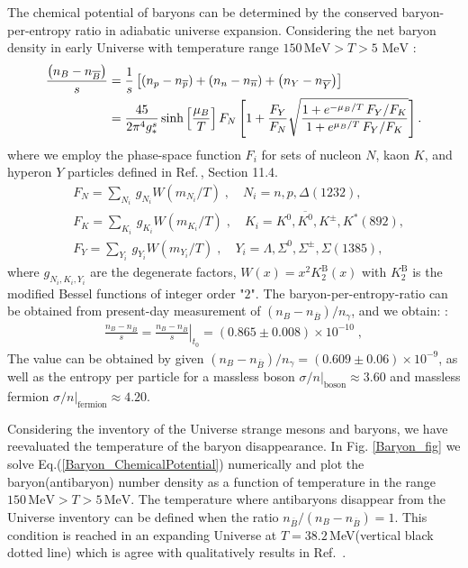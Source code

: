 \documentclass[universe,article,submit,moreauthors,pdftex,a4paper]{Definitions/mdpi}
\newcommand{\MeV}{\text{ MeV}}
\begin{document}
The chemical potential of baryons can be determined by the conserved baryon-per-entropy ratio in adiabatic universe expansion. Considering the net baryon density in early Universe with temperature range $150\,\mathrm{MeV}>T>5\MeV$ \cite{Yang:2021bko}:
\begin{align}\label{Baryon_ChemicalPotential}
\frac{\left(n_B-n_{\overline{B}}\right)}{s}&=\frac{1}{s}\left[\left(n_p-n_{\overline{p}}\right)+\left(n_n-n_{\overline{n}}\right)+\left(n_Y-n_{\overline{Y}}\right)\right]\notag\\
&=\frac{45}{2\pi^4g^s_\ast}\sinh\left[\frac{\mu_B}{T}\right]F_N\left[1+\frac{F_Y}{F_N}\sqrt{\frac{1+e^{-\mu_B/T}\,F_Y/F_K}{1+e^{\mu_B/T}\,F_Y/F_K}}\right].
\end{align}
where we employ the phase-space function $F_i$ for sets of nucleon $N$, kaon $K$, and hyperon $Y$ particles defined in Ref.\,\cite{Letessier:2002ony}, Section 11.4.
\begin{align}
&F_N=\sum_{N_i}\,g_{N_i}W(m_{N_i}/T)\;, \quad N_i=n, p, \Delta(1232),\\
&F_K=\sum_{K_i}\,g_{K_i}W(m_{K_i}/T)\;, \quad K_i=K^0, \overline{K^0}, K^\pm, K^\ast(892),\\
&F_Y=\sum_{Y_i}\,g_{Y_i}W(m_{Y_i}/T)\;, \quad Y_i=\Lambda, \Sigma^0,\Sigma^\pm, \Sigma(1385),
\end{align}
where $g_{N_i,K_i,Y_i}$ are the degenerate factors, $W(x)=x^2K^\mathrm{B}_2(x)$ with $K^\mathrm{B}_2$ is the modified Bessel functions of integer order "$2$". The baryon-per-entropy-ratio can be obtained from present-day measurement of $\left(n_B-n_{\overline{B}}\right)/n_\gamma$, and we obtain: \cite{Yang:2021bko}:
\begin{align}\label{BdS}
\frac{n_B-n_{\overline{B}}}{s}= \left.\frac{n_B-n_{\overline{B}}}{s}\right|_{t_0}=(0.865\pm0.008)\times10^{-10} \;,
\end{align}
The value can be obtained by given $\left(n_B-n_{\overline{B}}\right)/n_\gamma= (0.609\pm0.06)\times10^{-9}$, as well as the entropy per particle for a massless boson $\sigma/n|_\mathrm{boson}\approx 3.60$ and massless fermion $\sigma/n|_\mathrm{fermion}\approx 4.20$.

 Considering the inventory of the Universe strange mesons and baryons, we have reevaluated the temperature of the baryon disappearance.
In Fig. \ref{Baryon_fig} we solve Eq.(\ref{Baryon_ChemicalPotential}) numerically and plot the baryon(antibaryon) number density as a function of temperature in the range $150\,\mathrm{MeV}>T>5\,\mathrm{MeV}$. The temperature where antibaryons disappear from the Universe inventory can be defined when the ratio $n_{\overline B}/(n_B-n_{\overline B})=1$. This condition is reached in an expanding Universe at $T=38.2$\,MeV(vertical black dotted line) which is agree with qualitatively results in Ref.\,\cite{kolb1981early} . 
\end{document}

